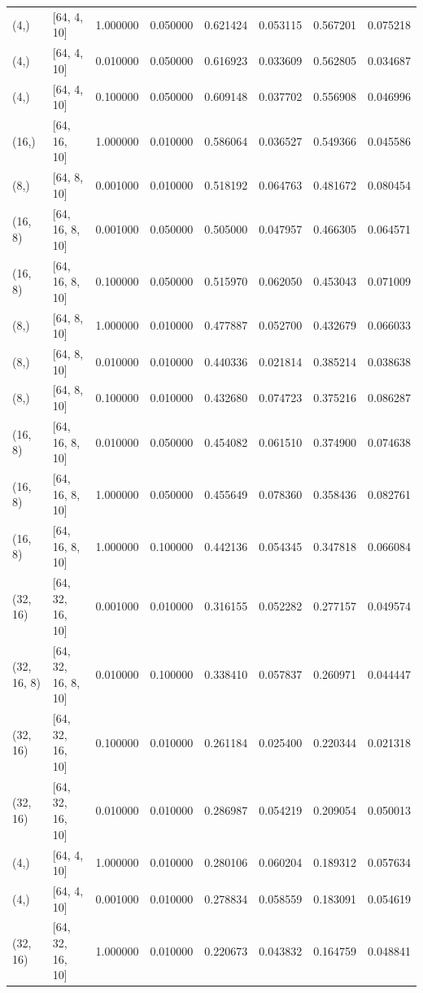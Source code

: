 \documentclass{article}
\begin{document}
\begin{longtable}{llrrrrrr}
(4,) & [64, 4, 10] & 1.000000 & 0.050000 & 0.621424 & 0.053115 & 0.567201 & 0.075218 \\
(4,) & [64, 4, 10] & 0.010000 & 0.050000 & 0.616923 & 0.033609 & 0.562805 & 0.034687 \\
(4,) & [64, 4, 10] & 0.100000 & 0.050000 & 0.609148 & 0.037702 & 0.556908 & 0.046996 \\
(16,) & [64, 16, 10] & 1.000000 & 0.010000 & 0.586064 & 0.036527 & 0.549366 & 0.045586 \\
(8,) & [64, 8, 10] & 0.001000 & 0.010000 & 0.518192 & 0.064763 & 0.481672 & 0.080454 \\
(16, 8) & [64, 16, 8, 10] & 0.001000 & 0.050000 & 0.505000 & 0.047957 & 0.466305 & 0.064571 \\
(16, 8) & [64, 16, 8, 10] & 0.100000 & 0.050000 & 0.515970 & 0.062050 & 0.453043 & 0.071009 \\
(8,) & [64, 8, 10] & 1.000000 & 0.010000 & 0.477887 & 0.052700 & 0.432679 & 0.066033 \\
(8,) & [64, 8, 10] & 0.010000 & 0.010000 & 0.440336 & 0.021814 & 0.385214 & 0.038638 \\
(8,) & [64, 8, 10] & 0.100000 & 0.010000 & 0.432680 & 0.074723 & 0.375216 & 0.086287 \\
(16, 8) & [64, 16, 8, 10] & 0.010000 & 0.050000 & 0.454082 & 0.061510 & 0.374900 & 0.074638 \\
(16, 8) & [64, 16, 8, 10] & 1.000000 & 0.050000 & 0.455649 & 0.078360 & 0.358436 & 0.082761 \\
(16, 8) & [64, 16, 8, 10] & 1.000000 & 0.100000 & 0.442136 & 0.054345 & 0.347818 & 0.066084 \\
(32, 16) & [64, 32, 16, 10] & 0.001000 & 0.010000 & 0.316155 & 0.052282 & 0.277157 & 0.049574 \\
(32, 16, 8) & [64, 32, 16, 8, 10] & 0.010000 & 0.100000 & 0.338410 & 0.057837 & 0.260971 & 0.044447 \\
(32, 16) & [64, 32, 16, 10] & 0.100000 & 0.010000 & 0.261184 & 0.025400 & 0.220344 & 0.021318 \\
(32, 16) & [64, 32, 16, 10] & 0.010000 & 0.010000 & 0.286987 & 0.054219 & 0.209054 & 0.050013 \\
(4,) & [64, 4, 10] & 1.000000 & 0.010000 & 0.280106 & 0.060204 & 0.189312 & 0.057634 \\
(4,) & [64, 4, 10] & 0.001000 & 0.010000 & 0.278834 & 0.058559 & 0.183091 & 0.054619 \\
(32, 16) & [64, 32, 16, 10] & 1.000000 & 0.010000 & 0.220673 & 0.043832 & 0.164759 & 0.048841 \\

\end{longtable}
\end{document}
